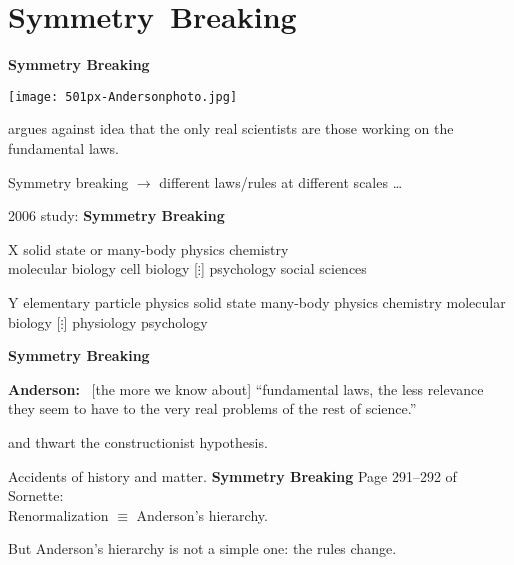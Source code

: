 \section{Symmetry\ Breaking}
  \textbf{Symmetry Breaking}
    
    \bigskip
      
      
      \texttt{[image: 501px-Andersonphoto.jpg]}
       
        argues against idea that the only real scientists are
        those working on the fundamental laws.
      
        Symmetry breaking $\rightarrow$ different laws/rules at
        different scales \ldots
    \bigskip

    {2006 study: }
  \textbf{Symmetry Breaking}

  \textbf{}
        
         X 
         solid state or many-body physics 
         chemistry \\ \mbox{}
         molecular biology 
         cell biology
        [$\vdots$]
         psychology
         social sciences
      
        
         Y
         elementary particle physics 
         solid state many-body physics
         chemistry 
         molecular biology 
        [$\vdots$]
         physiology 
         psychology
    
  \textbf{Symmetry Breaking}

  \textbf{Anderson:}
      \ [the more we know about] ``fundamental laws, the less
      relevance they seem to have to the very real problems
      of the rest of science.''
    
       and 
      thwart the constructionist hypothesis.
    
      Accidents of history 
      and 
      matter.
  \textbf{Symmetry Breaking}
      Page 291--292 of Sornette\cite{sornette2003a}:\\
      Renormalization $\equiv$ Anderson's hierarchy.
    
      But Anderson's hierarchy is not a simple one: the rules change.
    
